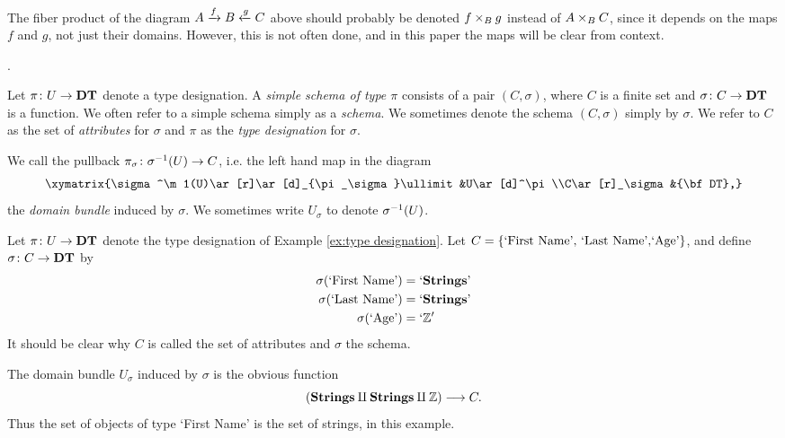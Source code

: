 \documentclass{amsart}
\def\DT{{\bf DT}}
\def\Strings{{\bf Strings}}
\def\'{\tn{'}}
\def\C{\check{\tn{C}}}
\begin{document}
\begin{remark}

The fiber product of the diagram $A\xrightarrow{f}B\xleftarrow{g}C$ above should probably be denoted $f\times_Bg$ instead of $A\times_BC$, since it depends on the maps $f$ and $g$, not just their domains.  However, this is not often done, and in this paper the maps will be clear from context.

\end{remark}

\begin{definition}\label{def:simple schema}.

Let $\pi\taking U\to\DT$ denote a type designation.  A {\em simple schema of type $\pi$} consists of a pair $(C,\sigma)$, where $C$ is a finite set and $\sigma\taking C\to\DT$ is a function.   We often refer to a simple schema simply as a {\em schema}.  We sometimes denote the schema $(C,\sigma)$ simply by $\sigma$.  We refer to $C$ as the set of {\em attributes} for $\sigma$ and $\pi$ as the {\em type designation} for $\sigma$.

We call the pullback $\pi_\sigma\taking\sigma^\m1(U)\to C$, i.e. the left hand map in the diagram $$\xymatrix{\sigma^\m1(U)\ar[r]\ar[d]_{\pi_\sigma}\ullimit&U\ar[d]^\pi\\C\ar[r]_\sigma&\DT,}$$ the {\em domain bundle} induced by $\sigma$.  We sometimes write $U_\sigma$ to denote $\sigma^\m1(U)$.

\end{definition}

\begin{example}\label{ex:schema}

Let $\pi\taking U\to\DT$ denote the type designation of Example \ref{ex:type designation}.  Let $C=\{\textnormal{`First Name', `Last Name',`Age'}\}$, and define $\sigma\taking C\to\DT$ by \begin{align*}\sigma(\tn{`First Name'})&=`\Strings\'\\\sigma(\tn{`Last Name'})&=`\Strings\'\\\sigma(\tn{`Age'})&=`\ZZ'\end{align*}    It should be clear why $C$ is called the set of attributes and $\sigma$ the schema.

The domain bundle $U_\sigma$ induced by $\sigma$ is the obvious function $$(\Strings\amalg\Strings\amalg\ZZ)\too C.$$  Thus the set of objects of type `First Name' is the set of strings, in this example.

\end{example}
\end{document}
